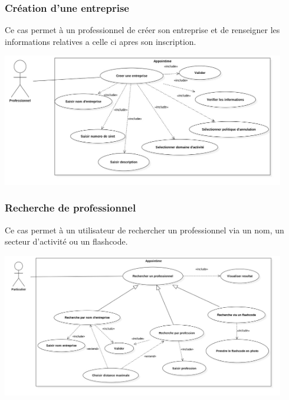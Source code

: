 \documentclass{article}
\begin{document}
\subsubsection{Création d'une entreprise}
Ce cas permet à un professionnel de créer son entreprise et de renseigner les informations relatives a celle ci apres son inscription.
\begin{center}
  \includegraphics[width=350pt]{diagram/useCaseCreerEntreprise}
\end{center}


\subsubsection{Recherche de professionnel}
Ce cas permet à un utilisateur de rechercher un professionnel via un nom, un secteur d'activité ou un flashcode.
\begin{center}
  \includegraphics[width=350pt]{diagram/useCaseRecherchePro}
\end{center}
\end{document}
